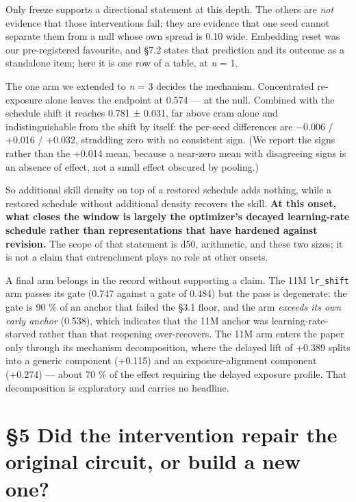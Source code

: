 \documentclass{article}
\begin{document}
Only freeze supports a directional statement at this depth. The others are \emph{not} evidence
that those interventions fail; they are evidence that one seed cannot separate them from a
null whose own spread is 0.10 wide. Embedding reset was our pre-registered favourite, and
§7.2 states that prediction and its outcome as a standalone item; here it is one row of a
table, at \emph{n} = 1.

The one arm we extended to \emph{n} = 3 decides the mechanism. Concentrated re-exposure alone
leaves the endpoint at 0.574 --- at the null. Combined with the schedule shift it reaches
0.781 ± 0.031, far above cram alone and indistinguishable from the shift by itself: the
per-seed differences are −0.006 / +0.016 / +0.032, straddling zero with no consistent sign.
(We report the signs rather than the +0.014 mean, because a near-zero mean with disagreeing
signs is an absence of effect, not a small effect obscured by pooling.)

So additional skill density on top of a restored schedule adds nothing, while a restored
schedule without additional density recovers the skill. \textbf{At this onset, what closes the
window is largely the optimizer's decayed learning-rate schedule rather than representations
that have hardened against revision.} The scope of that statement is d50, arithmetic, and
these two sizes; it is not a claim that entrenchment plays no role at other onsets.

A final arm belongs in the record without supporting a claim. The 11M \texttt{lr\_shift} arm passes
its gate (0.747 against a gate of 0.484) but the pass is degenerate: the gate is 90 \% of an
anchor that failed the §3.1 floor, and the arm \emph{exceeds its own early anchor} (0.538),
which indicates that the 11M anchor was learning-rate-starved rather than that reopening
over-recovers. The 11M arm enters the paper only through its mechanism decomposition, where
the delayed lift of +0.389 splits into a generic component (+0.115) and an
exposure-alignment component (+0.274) --- about 70 \% of the effect requiring the delayed
exposure profile. That decomposition is exploratory and carries no headline.

\section{§5 Did the intervention repair the original circuit, or build a new one?}\label{did-the-intervention-repair-the-original-circuit-or-build-a-new-one}
\end{document}
